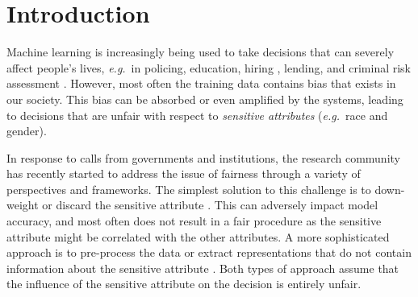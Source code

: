 \documentclass{article}
\newcommand{\eg}{\emph{e.g.}}
\begin{document}


\printAffiliationsAndNotice{}  

\begin{abstract}
We consider the problem of learning fair decision systems in complex scenarios in which a sensitive attribute might affect the decision along both fair and unfair pathways.
We introduce a causal approach to disregard effects along unfair pathways that simplifies and generalizes previous literature.
Our method corrects observations adversely affected by the sensitive attribute, and uses these to form a decision.
This avoids disregarding fair information, and does not require an often intractable computation of the path-specific effect. 
We leverage recent developments in deep learning and approximate inference to achieve a solution that is widely applicable to complex, non-linear scenarios.
\end{abstract}

\section{Introduction}
\label{intro}
Machine learning is increasingly being used to take decisions that can severely affect people's lives, \eg~in policing, education, hiring \cite{hoffman15discretion}, lending, and criminal risk assessment \cite{dieterich16compas}. 
However, most often the training data contains bias that exists in our society. This bias can be absorbed or even amplified by the systems,
leading to decisions that are unfair with respect to \emph{sensitive attributes} (\eg~race and gender).

In response to calls from governments and institutions, the research community has recently started to
address the issue of fairness through a variety of perspectives and frameworks. %
The simplest solution to this challenge is to down-weight or discard the sensitive attribute \cite{zeng16interpretable}. 
This can adversely impact model accuracy, and most often does not result in a fair procedure as the sensitive attribute might be correlated with the other attributes. 
A more sophisticated approach is to pre-process the data or extract representations that do not contain information about the sensitive attribute \cite{zemel13learning,feldman15certifying,edwards16censoring,louizos16fair,calmon17optimized}. 
Both types of approach  assume that the influence of the sensitive attribute on the decision is entirely unfair. 
\end{document}

